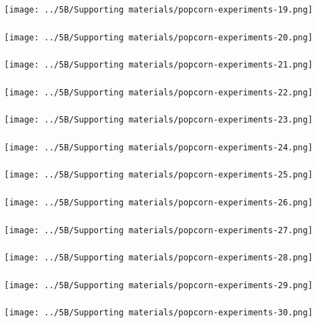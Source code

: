 \begin{frame}\frametitle{}
	\centerline{\texttt{[image: ../5B/Supporting materials/popcorn-experiments-19.png]}}
\end{frame}
\begin{frame}\frametitle{}
	\centerline{\texttt{[image: ../5B/Supporting materials/popcorn-experiments-20.png]}}
\end{frame}
\begin{frame}\frametitle{}
	\centerline{\texttt{[image: ../5B/Supporting materials/popcorn-experiments-21.png]}}
\end{frame}
\begin{frame}\frametitle{}
	\centerline{\texttt{[image: ../5B/Supporting materials/popcorn-experiments-22.png]}}
\end{frame}
\begin{frame}\frametitle{}
	\centerline{\texttt{[image: ../5B/Supporting materials/popcorn-experiments-23.png]}}
\end{frame}
\begin{frame}\frametitle{}
	\centerline{\texttt{[image: ../5B/Supporting materials/popcorn-experiments-24.png]}}
\end{frame}
\begin{frame}\frametitle{}
	\centerline{\texttt{[image: ../5B/Supporting materials/popcorn-experiments-25.png]}}
\end{frame}
\begin{frame}\frametitle{}
	\centerline{\texttt{[image: ../5B/Supporting materials/popcorn-experiments-26.png]}}
\end{frame}
\begin{frame}\frametitle{}
	\centerline{\texttt{[image: ../5B/Supporting materials/popcorn-experiments-27.png]}}
\end{frame}
\begin{frame}\frametitle{}
	\centerline{\texttt{[image: ../5B/Supporting materials/popcorn-experiments-28.png]}}
\end{frame}
\begin{frame}\frametitle{}
	\centerline{\texttt{[image: ../5B/Supporting materials/popcorn-experiments-29.png]}}
\end{frame}
\begin{frame}\frametitle{}
	\centerline{\texttt{[image: ../5B/Supporting materials/popcorn-experiments-30.png]}}
\end{frame}
